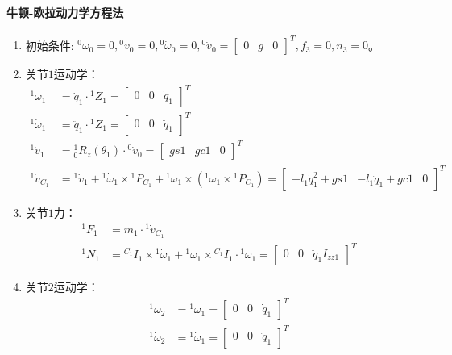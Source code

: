 \documentclass[
12pt, %
a4paper, 
oneside, %
headinclude,footinclude, %
]{scrartcl}
\begin{document}
{\paragraph{牛顿-欧拉动力学方程法}
\begin{enumerate}
\item 初始条件: $ {}^0 \omega_0 = 0, {}^0 v_0 = 0, {}^0 \dot{\omega}_0 = 0, {}^0 \dot{v}_0 = \begin{bmatrix} 0 & g & 0 \end{bmatrix}^T, f_3 = 0, n_3 = 0 $。
\item 关节$ 1 $运动学：
\begin{align*}
{}^1 \omega_1 &= \dot{q}_1 \cdot {}^1 Z_1 = \begin{bmatrix} 0 & 0 & \dot{q}_1 \end{bmatrix}^T \\
{}^1 \dot{\omega}_1 &= \ddot{q}_1 \cdot {}^1 Z_1 = \begin{bmatrix} 0 & 0 & \ddot{q}_1 \end{bmatrix}^T \\
{}^1 \dot{v}_1 &= {}^1_0 R_z(\theta_1) \cdot {}^0 \dot{v}_0 = \begin{bmatrix} gs1 & gc1 & 0 \end{bmatrix}^T \\
{}^1 \dot{v}_{C_1} &= {}^1 \dot{v}_1 + {}^1 \dot{\omega}_1 \times {}^1 P_{C_1} + {}^1 \omega_1 \times ({}^1 \omega_1 \times {}^1 P_{C_1}) = \begin{bmatrix} -l_1 \dot{q}_1^2 + gs1 & -l_1 \ddot{q}_1 + gc1 & 0 \end{bmatrix}^T
\end{align*}
\item 关节$ 1 $力：
\begin{align*}
{}^1 F_1 &= m_1 \cdot {}^1 \dot{v}_{C_1} \\
{}^1 N_1 &= {}^{C_1}I_1 \times {}^1 \dot{\omega}_1 + {}^1 \omega_1 \times {}^{C_1}I_1 \cdot {}^1 \omega_1 = \begin{bmatrix} 0 & 0 & \ddot{q}_1 I_{zz1} \end{bmatrix}^T
\end{align*}
\item 关节$ 2 $运动学：
\begin{align*}
{}^1 \omega_2 &= {}^1 \omega_1 = \begin{bmatrix} 0 & 0 & \dot{q}_1 \end{bmatrix}^T \\
{}^1 \dot{\omega}_2 &= {}^1 \dot{\omega}_1 = \begin{bmatrix} 0 & 0 & \ddot{q}_1 \end{bmatrix}^T \\

\end{align*}
\end{enumerate}}
\end{document}
